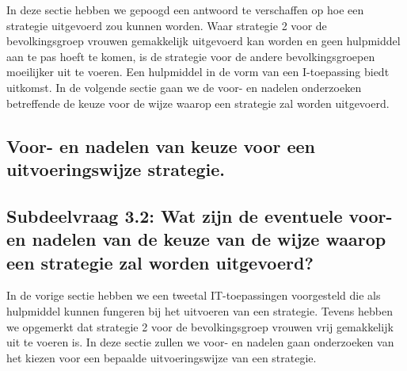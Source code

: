 In deze sectie hebben we gepoogd een antwoord te verschaffen op hoe een strategie uitgevoerd zou kunnen worden. Waar strategie 2 voor de bevolkingsgroep vrouwen gemakkelijk uitgevoerd kan worden en geen hulpmiddel aan te pas hoeft te komen, is de strategie voor de andere bevolkingsgroepen moeilijker uit te voeren. Een hulpmiddel in de vorm van een I-toepassing biedt uitkomst. In de volgende sectie gaan we de voor- en nadelen onderzoeken betreffende de keuze voor de wijze waarop een strategie zal worden uitgevoerd. 

\subsection{Voor- en nadelen van keuze voor een uitvoeringswijze strategie.}

\subsection*{Subdeelvraag 3.2: Wat zijn de eventuele voor- en nadelen van de keuze van de wijze waarop een strategie zal worden uitgevoerd?}
In de vorige sectie hebben we een tweetal IT-toepassingen voorgesteld die als hulpmiddel kunnen fungeren bij het uitvoeren van een strategie. Tevens hebben we opgemerkt dat strategie 2 voor de bevolkingsgroep vrouwen vrij gemakkelijk uit te voeren is. In deze sectie zullen we voor- en nadelen gaan onderzoeken van het kiezen voor een bepaalde uitvoeringswijze van een strategie. 

